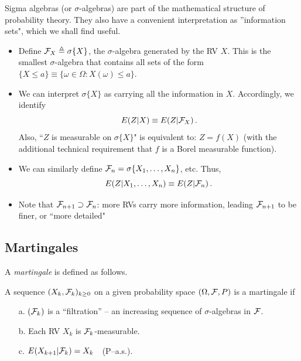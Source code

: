 Sigma algebras (or $\sigma$-algebras) are part of the mathematical structure of
probability theory.
They also have a convenient interpretation as ''information sets", which
we shall find useful.

\begin{itemize}
\item
Define $\mathcal F_X\triangleq \sigma\{X\}$, the $\sigma$-algebra generated by the RV $X$.
This is the smallest $\sigma$-algebra that contains all sets of the
form $\{X\leq a\} \equiv \{\omega\in\Omega: X(\omega) \leq a\}$.
\item
We can interpret $\sigma\{X\}$ as carrying all the information in
$X$. Accordingly, we identify
$$
E(Z | X) \equiv E(Z | \mathcal F_X)\,.
$$
Also, ``$Z$ is measurable on $\sigma\{X\}$"  is equivalent to:
$Z=f(X)$ (with the additional technical requirement that $f$ is a
Borel measurable function).
\item
We can similarly define $\mathcal F_n = \sigma\{X_1,\dots, X_n\}$, etc. Thus,
$$
E(Z | X_1,\dots,X_n) \equiv E(Z | \mathcal F_n)\,.
$$
\item
Note that $\mathcal F_{n+1} \supset \mathcal F_n$: more RVs carry more information,
leading $\mathcal F_{n+1}$ to be finer, or ``more detailed"
\end{itemize}

\subsection{Martingales}
A \emph{martingale} is defined as follows.
\begin{definition}
A sequence $(X_k, \mathcal F_k)_{k\ge 0}$
on a given probability space $(\Omega,\mathcal F, P)$
is a martingale if
\begin{itemize}
\item[a.]
$(\mathcal F_k)$ is a ``filtration'' -- an increasing sequence of
$\sigma$-algebras in $\mathcal F$.
\item[b.]
Each RV  $X_k$ is $\mathcal F_k$-measurable.
\item[c.]
$E(X_{k+1} | \mathcal F_k) = X_k$\ \  (P--a.s.).
\end{itemize}
\end{definition}
